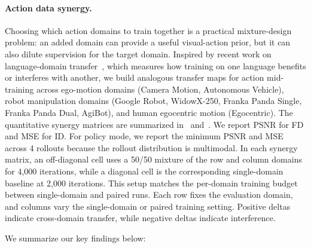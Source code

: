 

\paragraph{Action data synergy.}
\label{app:action_data_synergy}
Choosing which action domains to train together is a practical mixture-design problem: an added domain can provide a useful visual-action prior, but it can also dilute supervision for the target domain.
Inspired by recent work on language-domain transfer~\citep{longpre2026atlas}, which measures how training on one language benefits or interferes with another, we build analogous transfer maps for action mid-training across ego-motion domains (Camera Motion, Autonomous Vehicle), robot manipulation domains (Google Robot, WidowX-250, Franka Panda Single, Franka Panda Dual, AgiBot), and human egocentric motion (Egocentric).
The quantitative synergy matrices are summarized in~ and~.
We report PSNR for FD and MSE for ID.
For policy mode, we report the minimum PSNR and MSE across 4 rollouts because the rollout distribution is multimodal.
In each synergy matrix, an off-diagonal cell uses a 50/50 mixture of the row and column domains for 4{,}000 iterations, while a diagonal cell is the corresponding single-domain baseline at 2{,}000 iterations.
This setup matches the per-domain training budget between single-domain and paired runs.
Each row fixes the evaluation domain, and columns vary the single-domain or paired training setting.
Positive deltas indicate cross-domain transfer, while negative deltas indicate interference.

We summarize our key findings below:



